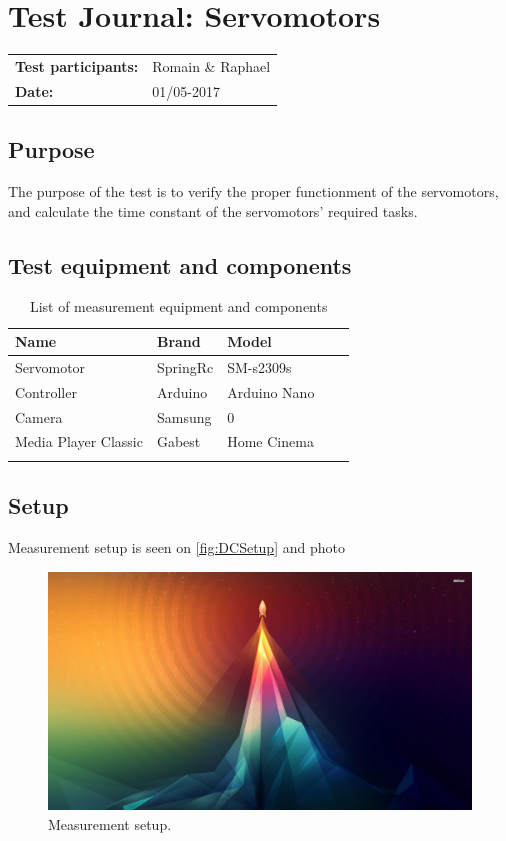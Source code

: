 \graphicspath{{figures/design/}}


			\chapter{Test Journal: Servomotors}



\begin{table}[!h]
\begin{tabular}{l l}
\textbf{Test participants:} & Romain \& Raphael   \\
\textbf{Date:}  & 01/05-2017
\end{tabular}
\end{table}




	\section*{Purpose}
The purpose of the test is to verify the proper functionment of the servomotors, and calculate the time constant of the servomotors' required tasks.




	\section*{Test equipment and components}
\begin{table}[h]
	\centering
	\caption{List of measurement equipment and components}\label{tab_appendix:template}

	\begin{tabularx}{\textwidth}{lXXXX}
		Name 				& Brand	& Model 									\\ \toprule \rowcolor{lightGrey}
		Servomotor	& SpringRc & SM-s2309s 	\\
		Controller	& Arduino & Arduino Nano\\ 
		Camera & Samsung & 0\\
		Media Player Classic & Gabest & Home Cinema\\ \rowcolor{lightGrey}
	\end{tabularx}
\end{table}




	\section*{Setup}
Measurement setup is seen on \autoref{fig:DCSetup} and photo \
\begin{figure} [h]
\centering
\includegraphics[width=0.6\linewidth]{figures/frontpage.jpg}
\caption{Measurement setup.}
\label{fig:DCSetup}
\end{figure}

